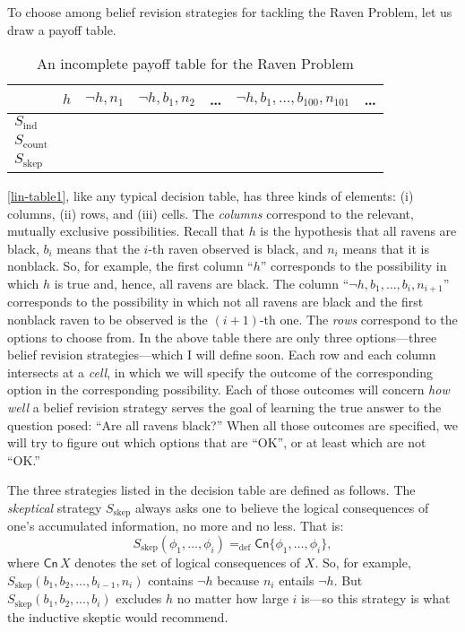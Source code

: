 To choose among belief revision strategies for tackling the Raven Problem, let us draw a payoff table.
\begin{table}[ht]
\centering
\begin{tabular}{lcccccc}
	& $h$ & $\neg h, n_1$ & $\neg h, b_1, n_2$ & \ldots & $\neg h, b_1, \ldots, b_{100}, n_{101}$ & \ldots 
\\ \hline\hline
  	$S_{\textrm{ind}}$ &&&&&& \\
  	$S_{\textrm{count}}$ &&&&&& \\
  	$S_{\textrm{skep}}$ &&&&&& \\
\end{tabular}
\caption{An incomplete payoff table for the Raven Problem}\label{lin-table1}
\end{table}
\autoref{lin-table1}, like any typical decision table, has three kinds of elements: (i) columns, (ii) rows, and (iii) cells. The {\em columns} correspond to the relevant, mutually exclusive possibilities. Recall that $h$ is the hypothesis that all ravens are black, $b_i$ means that the $i$-th raven observed is black, and $n_i$ means that it is nonblack. So, for example, the first column ``$h$'' corresponds to the possibility in which $h$ is true and, hence, all ravens are black. The column ``$\neg h, b_1, \dots, b_i, n_{i+1}$'' corresponds to the possibility in which not all ravens are black and the first nonblack raven to be observed is the $(i+1)$-th one. The {\em rows} correspond to the options to choose from. In the above table there are only three options---three belief revision strategies---which I will define soon. Each row and each column intersects at a {\em cell}, in which we will specify the outcome of the corresponding option in the corresponding possibility. Each of those outcomes will concern {\em how well} a belief revision strategy serves the goal of learning the true answer to the question posed: ``Are all ravens black?'' When all those outcomes are specified, we will try to figure out which options that are ``OK'', or at least which are not ``OK.'' 

The three strategies listed in the decision table are defined as follows. The {\em skeptical} strategy $S_{\textrm{skep}}$ always asks one to believe the logical consequences of one's accumulated information, no more and no less. That is:
$$S_{\textrm{skep}}(\phi_1, \ldots, \phi_i) =_\text{def} \mathsf{Cn}\{\phi_1, \ldots, \phi_i\},$$
where $\mathsf{Cn}\,X$ denotes the set of logical consequences of $X$. So, for example, $S_{\textrm{skep}}(b_1, b_2, \dots, b_{i-1}, n_i)$ contains $\neg h$ because $n_i$ entails $\neg h$. But $S_{\textrm{skep}}(b_1, b_2, \dots, b_i)$ excludes $h$ no matter how large $i$ is---so this strategy is what the inductive skeptic would recommend.  

